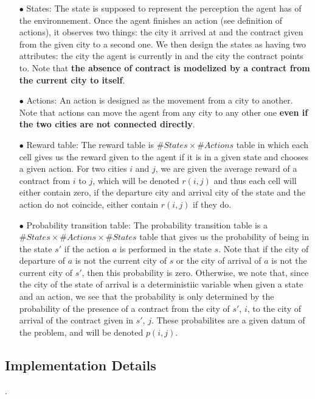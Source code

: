 \documentclass[11pt]{article}
\begin{document}
 	\begin{itemize}
 		 \item[$\bullet$] States: The state is supposed to represent the perception the agent has of the environnement. Once the agent finishes an action (see definition of actions), it observes two things: the city it arrived at and the contract given from the given city to a second one. We then design the states as having two attributes: the city the agent is currently in and the city the contract points to. Note that \textbf{the absence of contract is modelized by a contract from the current city to itself}.
 		 
 		 \item[$\bullet$] Actions: An action is designed as the movement from a city to another. Note that actions can move the agent from any city to any other one \textbf{even if the two cities are not connected directly}.
 		 
 		 \item[$\bullet$] Reward table: The reward table is $\# States\times\# Actions$ table in which each cell gives us the reward given to the agent if it is in a given state and chooses a given action. For two cities $i$ and $j$, we are given the average reward of a contract from $i$ to $j$, which will be denoted $r(i,j)$ and thus each cell will either contain zero, if the departure city and arrival city of the state and the action do not coincide, either contain $r(i,j)$ if they do.
 		 
 		 \item[$\bullet$] Probability transition table: The probability transition table is a $\# States\times\# Actions\times\# States$ table that gives us the probability of being in the state $s'$ if the action $a$ is performed in the state $s$. Note that if the city of departure of $a$ is not the current city of $s$ or the city of arrival of $a$ is not the current city of $s'$, then this probability is zero. Otherwise, we note that, since the city of the state of arrival is a deterministiic variable when given a state and an action, we see that the probability is only determined by the probability of the presence of a contract from the city of $s'$, $i$, to the city of arrival of the contract given in $s'$, $j$. These probabilites are a given datum of the problem, and will be denoted $p(i,j)$.
	\end{itemize}
 		 
\subsection{Implementation Details}.
\end{document}
